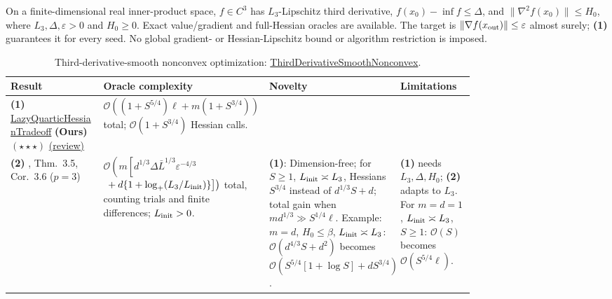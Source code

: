 \begin{table}[tp]
\centering
\caption{Third-derivative-smooth nonconvex optimization: \href{https://github.com/k3nfalt/longtails/blob/main/LongTails/Setups/ThirdDerivativeSmoothNonconvex.lean}{ThirdDerivativeSmoothNonconvex}.}\label{tab:ThirdDerivativeSmoothNonconvex}
\parbox{\linewidth}{\footnotesize On a finite-dimensional real inner-product space, $f\in C^3$ has $L_3$-Lipschitz third derivative, $f(x_0)-\inf f\le\Delta$, and $\|\nabla^2f(x_0)\|\le H_0$, where $L_3,\Delta,\varepsilon>0$ and $H_0\ge0$. Exact value/gradient and full-Hessian oracles are available. The target is $\|\nabla f(x_{\rm out})\|\le\varepsilon$ almost surely; \textbf{(1)} guarantees it for every seed. No global gradient- or Hessian-Lipschitz bound or algorithm restriction is imposed.}\par\smallskip
\begin{threeparttable}
\footnotesize
\setlength{\tabcolsep}{4pt}\renewcommand{\arraystretch}{1.25}
\begin{tabularx}{\linewidth}{@{}>{\raggedright\arraybackslash}p{0.20\linewidth}>{\raggedright\arraybackslash}p{0.32\linewidth}>{\raggedright\arraybackslash}p{0.25\linewidth}>{\raggedright\arraybackslash}X@{}}
\toprule
\textbf{Result} & \textbf{Oracle complexity} & \textbf{Novelty} & \textbf{Limitations} \\
\midrule
\textbf{(1)} \href{https://github.com/k3nfalt/longtails/blob/main/LongTails/Theorems/LazyQuarticHessianTradeoff.lean}{Lazy\allowbreak Quartic\allowbreak Hessian\allowbreak Tradeoff} \textbf{(Ours)} $(\star\star\star)$ \href{https://github.com/k3nfalt/longtails/blob/main/scripts/reviews/LazyQuarticHessianTradeoff.md}{(review)}
& $\mathcal{O}\!\left((1+S^{5/4})\ell+m(1+S^{3/4})\right)$ total; $\mathcal{O}(1+S^{3/4})$ Hessian calls.
& & \\
\midrule[1.2pt]
\textbf{(2)} \citep{tdsDoikovGrapiglia2025v1}, Thm.~3.5, Cor.~3.6 ($p=3$)
& $\mathcal{O}\!\left(m\left[d^{1/3}\Delta\bar L^{1/3}\varepsilon^{-4/3}\right.\right.$\newline
$\left.\left.{}+d\{1+\log_+(L_3/L_{\rm init})\}\right]\right)$ total, counting trials and finite differences; $L_{\rm init}>0$.
& \textbf{(1)}: Dimension-free; for $S\ge1$, $L_{\rm init}\asymp L_3$, Hessians $S^{3/4}$ instead of $d^{1/3}S+d$; total gain when $md^{1/3}\gg S^{1/4}\ell$.
\newline Example: $m=d$, $H_0\le\beta$, $L_{\rm init}\asymp L_3$: $\mathcal{O}(d^{4/3}S+d^2)$ becomes $\mathcal{O}(S^{5/4}[1+\log S]+dS^{3/4})$.
& \textbf{(1)} needs $L_3,\Delta,H_0$; \textbf{(2)} adapts to $L_3$. For $m=d=1$, $L_{\rm init}\asymp L_3$, $S\ge1$: $\mathcal{O}(S)$ becomes $\mathcal{O}(S^{5/4}\ell)$. \\

\end{tabularx}
\end{threeparttable}
\end{table}
